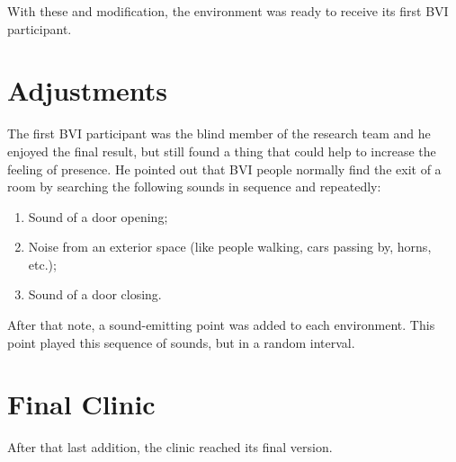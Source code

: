     With these  and  modification, the environment was ready to receive its first BVI participant.
        
\section{Adjustments}

    The first BVI participant was the blind member of the research team and he enjoyed the final result, but still found a thing that could help to increase the feeling of presence. He pointed out that BVI people normally find the exit of a room by searching the following sounds in sequence and repeatedly:
    \begin{enumerate}
        \item Sound of a door opening;
        \item Noise from an exterior space (like people walking, cars passing by, horns, etc.);
        \item Sound of a door closing.
    \end{enumerate}
    After that note, a sound-emitting point was added to each environment. This point played this sequence of sounds, but in a random interval.

\section{Final Clinic}

    After that last addition, the clinic reached its final version.


